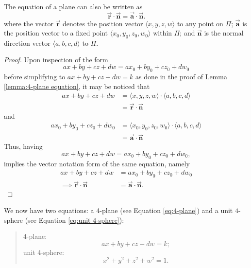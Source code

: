 \begin{corollary}\label{corollary:vector equation of n-plane}
    The equation of a plane can also be written as $$\Vec{\mathbf{r}} \cdot \Vec{\mathbf{n}} = \Vec{\mathbf{a}} \cdot \Vec{\mathbf{n}}.$$
    where the vector $\Vec{\mathbf{r}}$ denotes the position vector $\langle x, y, z, w\rangle$ to any point on $\Pi$; $\Vec{\mathbf{a}}$ is the position vector to a fixed point $\langle x_0, y_0, z_0, w_0\rangle$ within $\Pi$; and $\Vec{\mathbf{n}}$ is the normal direction vector $\langle a, b, c, d\rangle$ to $\Pi$.
\end{corollary}
\pagebreak
\begin{proof}
    Upon inspection of the form $$ax+by+cz+dw = ax_0+by_0+cz_0+dw_0$$ before simplifying to $ax+by+cz+dw = k$ as done in the proof of Lemma \ref{lemma:4-plane equation}, it may be noticed that
    \begin{align*}
        ax+by+cz+dw &= \langle x,y,z,w\rangle \cdot \langle a,b,c,d \rangle\\
       & = \Vec{\mathbf{r}} \cdot \Vec{\mathbf{n}}
    \end{align*}
    and
    \begin{align*}
        ax_0+by_0+cz_0+dw_0 &=\langle x_0,y_0,z_0,w_0\rangle \cdot \langle a,b,c,d \rangle\\
        &= \Vec{\mathbf{a}} \cdot \Vec{\mathbf{n}}
    \end{align*}
    Thus, having $$ax+by+cz+dw = ax_0+by_0+cz_0+dw_0,$$
    implies the vector notation form of the same equation, namely
    \begin{align*}
        ax+by+cz+dw &= ax_0+by_0+cz_0+dw_0\\
        \implies\Vec{\mathbf{r}} \cdot \Vec{\mathbf{n}} &= \Vec{\mathbf{a}} \cdot \Vec{\mathbf{n}}.
    \end{align*}
\end{proof}
\pagebreak
We now have two equations: a 4-plane (see Equation \ref{eq:4-plane}) and a unit $4$-sphere (see Equation \ref{eq:unit 4-sphere}):
\begin{quote}
    4-plane:$$ax+by+cz+dw=k;$$
    unit 4-sphere: $$x^2+y^2+z^2+w^2=1.$$
\end{quote}

